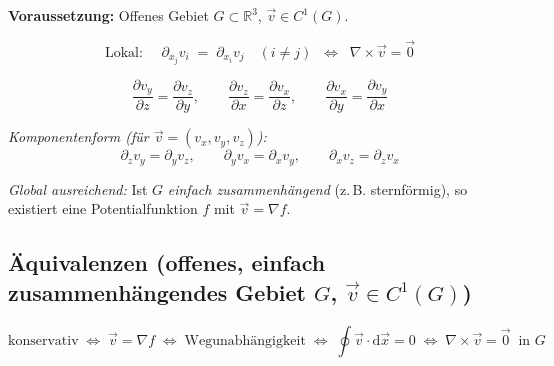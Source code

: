 \documentclass[a4paper,11pt,oneside,open=any,parskip=half, DIV=15]{scrreprt}
\begin{document}
      \textbf{Voraussetzung:} Offenes Gebiet \(G\subset\mathbb{R}^3\), \(\vec{v}\in C^1(G)\).

      \begin{importantbox}
      \[
      \text{Lokal: }\quad \partial_{x_j} v_i \;=\; \partial_{x_i} v_j \quad (i\neq j)
      \;\;\Longleftrightarrow\;\;
      \nabla\times\vec{v}=\vec{0}
      \]
      \end{importantbox}

      \begin{importantbox}
         \[
            \frac{\partial v_y}{\partial z}=\frac{\partial v_z}{\partial y},\qquad
            \frac{\partial v_z}{\partial x}=\frac{\partial v_x}{\partial z},\qquad
            \frac{\partial v_x}{\partial y}=\frac{\partial v_y}{\partial x}
         \]
      \end{importantbox}

      \textit{Komponentenform (für \(\vec{v}=(v_x,v_y,v_z)\)):}
      \[
      \partial_z v_y=\partial_y v_z,\qquad
      \partial_y v_x=\partial_x v_y,\qquad
      \partial_x v_z=\partial_z v_x
      \]

      \textit{Global ausreichend:} Ist \(G\) \emph{einfach zusammenhängend} (z.\,B. sternförmig), 
      so existiert eine Potentialfunktion \(f\) mit \(\vec{v}=\nabla f\).


   \subsection*{Äquivalenzen (offenes, einfach zusammenhängendes Gebiet \(G\), \(\vec{v}\in C^1(G)\))}
   \begin{importantbox}
   \[
   \text{konservativ}
   \;\Longleftrightarrow\;
   \vec{v}=\nabla f
   \;\Longleftrightarrow\;
   \text{Wegunabhängigkeit}
   \;\Longleftrightarrow\;
   \oint\vec{v}\cdot \mathrm{d}\vec{x}=0
   \;\Longleftrightarrow\;
   \nabla\times\vec{v}=\vec{0}\ \text{ in }G
   \]
   \end{importantbox}
\end{document}
